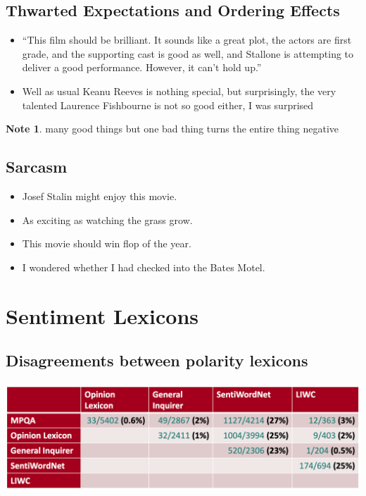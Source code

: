 \documentclass[11pt]{article}
\theoremstyle{definition}
\newtheorem{note}{Note}
\begin{document}
\subsection{Thwarted Expectations
and Ordering Effects}
\begin{itemize}
  \item “This film should be brilliant. It sounds like a great plot, the actors are first
  grade, and the supporting cast is good as well, and Stallone is attempting to
  deliver a good performance. However, it can’t hold up.”
  \item Well as usual Keanu Reeves is nothing special, but surprisingly, the very
  talented Laurence Fishbourne is not so good either, I was surprised
\end{itemize}
\begin{note}
  many good things but one bad thing turns the entire thing negative
\end{note}

\subsection{Sarcasm}
\begin{itemize}
  \item Josef Stalin might enjoy this movie.
  \item As exciting as watching the grass grow.
  \item This movie should win flop of the year.
  \item I wondered whether I had checked into the Bates Motel.
\end{itemize}

\section{Sentiment Lexicons}
\subsection{Disagreements between polarity lexicons}
\includegraphics[width=\textwidth]{14.png}
\end{document}
